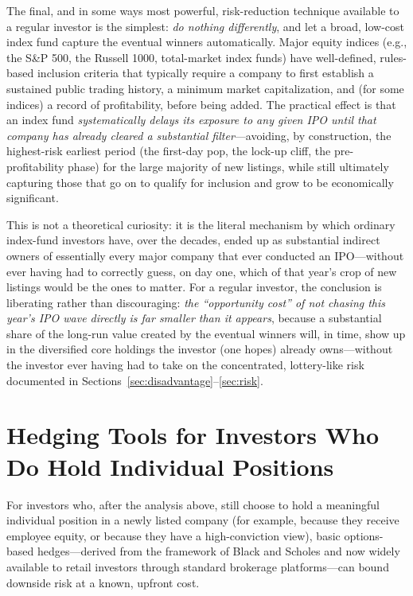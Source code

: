 \documentclass[conference]{IEEEtran}
\begin{document}
The final, and in some ways most powerful, risk-reduction technique available to a regular investor is the simplest: \emph{do nothing differently}, and let a broad, low-cost index fund capture the eventual winners automatically. Major equity indices (e.g., the S\&P 500, the Russell 1000, total-market index funds) have well-defined, rules-based inclusion criteria that typically require a company to first establish a sustained public trading history, a minimum market capitalization, and (for some indices) a record of profitability, before being added. The practical effect is that an index fund \emph{systematically delays its exposure to any given IPO until that company has already cleared a substantial filter}---avoiding, by construction, the highest-risk earliest period (the first-day pop, the lock-up cliff, the pre-profitability phase) for the large majority of new listings, while still ultimately capturing those that go on to qualify for inclusion and grow to be economically significant.

This is not a theoretical curiosity: it is the literal mechanism by which ordinary index-fund investors have, over the decades, ended up as substantial indirect owners of essentially every major company that ever conducted an IPO---without ever having had to correctly guess, on day one, which of that year's crop of new listings would be the ones to matter. For a regular investor, the conclusion is liberating rather than discouraging: \emph{the ``opportunity cost'' of not chasing this year's IPO wave directly is far smaller than it appears}, because a substantial share of the long-run value created by the eventual winners will, in time, show up in the diversified core holdings the investor (one hopes) already owns---without the investor ever having had to take on the concentrated, lottery-like risk documented in Sections~\ref{sec:disadvantage}--\ref{sec:risk}.

\section{Hedging Tools for Investors Who Do Hold Individual Positions}
\label{sec:hedging}

For investors who, after the analysis above, still choose to hold a meaningful individual position in a newly listed company (for example, because they receive employee equity, or because they have a high-conviction view), basic options-based hedges---derived from the framework of Black and Scholes \cite{blackscholes1973} and now widely available to retail investors through standard brokerage platforms---can bound downside risk at a known, upfront cost.
\end{document}
